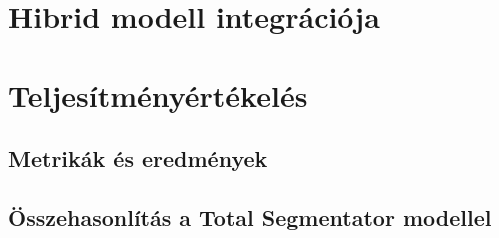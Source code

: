 \section{Hibrid modell integrációja}  %

\section{Teljesítményértékelés}  %

\subsection{Metrikák és eredmények}  %

\subsection{Összehasonlítás a Total Segmentator modellel}  %
